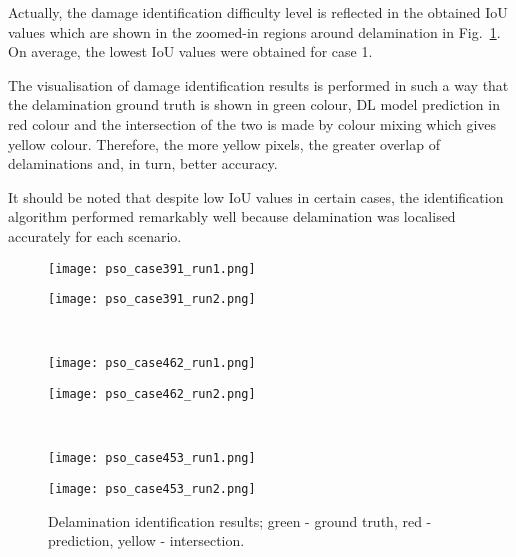 \documentclass[sn-mathphys-num]{sn-jnl}%
\begin{document}
	Actually, the damage identification difficulty level is reflected in the 
	obtained IoU values which are shown in the zoomed-in regions around 
	delamination in Fig.~\ref{fig:pso_identification}.
	On average, the lowest IoU values were obtained for case 1.
	
	The visualisation of damage identification results is performed in such a 
	way that the delamination ground truth is shown in green colour, DL model 
	prediction in red colour and the intersection of the two is made by colour 
	mixing which gives yellow colour.
	Therefore, the more yellow pixels, the greater overlap of delaminations 
	and, in turn, better accuracy.
	
	It should be noted that despite low IoU values in certain cases, the 
	identification algorithm performed remarkably well because delamination was 
	localised accurately for each scenario.
	
\begin{figure}
	\centering
	\begin{minipage}[b]{0.44\textwidth}
		\centering
		\texttt{[image: pso\_case391\_run1.png]}
		\caption*{Case 1, run 1}
		\label{fig:pso_case391_run1}
	\end{minipage}
	\hfill
	\begin{minipage}[b]{0.44\textwidth}
		\centering
		\texttt{[image: pso\_case391\_run2.png]}
		\caption*{Case 1, run 2}
		\label{fig:pso_case391_run2}
	\end{minipage}
	\\
	\begin{minipage}[b]{0.44\textwidth}
		\centering
		\texttt{[image: pso\_case462\_run1.png]}
		\caption*{Case 2, run 1}
		\label{fig:pso_case462_run1}
	\end{minipage}
	\hfill
	\begin{minipage}[b]{0.44\textwidth}
		\centering
		\texttt{[image: pso\_case462\_run2.png]}
		\caption*{Case 2, run 2}
		\label{fig:pso_case462_run2}
	\end{minipage}
	\\
	\begin{minipage}[b]{0.44\textwidth}
		\centering
		\texttt{[image: pso\_case453\_run1.png]}
		\caption*{Case 3, run 1}
		\label{fig:pso_case453_run1}
	\end{minipage}
	\hfill
	\begin{minipage}[b]{0.44\textwidth}
		\centering
		\texttt{[image: pso\_case453\_run2.png]}
		\caption*{Case 3, run 2}
		\label{fig:pso_case453_run2}
	\end{minipage}
	\caption{Delamination identification results; green - ground truth, red 
	- prediction, yellow - intersection.}
	\label{fig:pso_identification}
	\end{figure}
	
\end{document}
